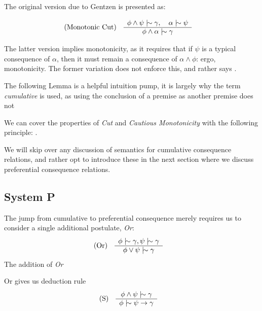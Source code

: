 The original version due to Gentzen \cite{Ben1993Mathematical} is presented as:

\begin{align}
  \inferLeft{Monotonic Cut}{\phi \land \psi \twiddle \gamma, \quad \alpha \twiddle \psi}{\phi \land \alpha \twiddle \gamma}
\end{align}

The latter version implies monotonicity, as it requires that if $\psi$ is a typical consequence of $\alpha$, then it must remain a consequence of $\alpha \land \phi$: ergo, monotonicity. The former
variation does not enforce this, and rather says .

The following Lemma is a helpful intuition pump, it is largely why the term \textit{cumulative} is used, as using the conclusion of a premise as another premise does not \cite{gabbay1985theoreticalFoundations}

\begin{lemma}
  \label{lemma:cut-cautious} We can cover the properties of \emph{Cut} and \emph{Cautious Monotonicity} with the following principle: .
\end{lemma}

We will skip over any discussion of semantics for cumulative consequence relations, and rather opt to introduce these in the next section where we discuss preferential consequence relations.

\subsection{System P}
\label{subsection:system-P}

The jump from cumulative to preferential consequence merely requires us to consider a single additional postulate, \textit{Or}:
%
\begin{align}
  \inferLeft{Or}{\phi \twiddle \gamma, \psi \twiddle \gamma}{\phi \lor \psi \twiddle \gamma}
\end{align}
The addition of \textit{Or}

Or gives us deduction rule
\begin{align}
  \inferLeft{S}{\phi \land \psi \twiddle \gamma}{\phi \twiddle \psi \rightarrow \gamma}
\end{align}


